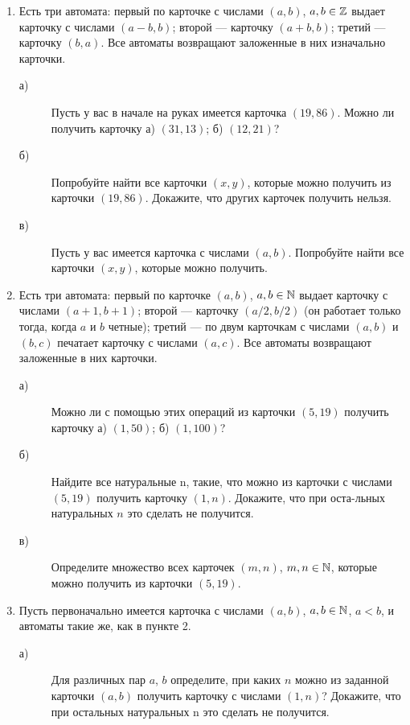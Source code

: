 \begin{enumerate}
\item Есть три автомата: первый по карточке с числами $(a, b)$, $a, b \in \mathbb{Z}$ выдает карточку с числами $(a - b, b)$;  второй — карточку $(a + b, b)$;  третий — карточку $(b, a)$. Все автоматы возвращают заложенные в них изначально карточки.
    \begin{description}
    \item [а) ]Пусть у вас в начале на руках имеется карточка $(19, 86)$. Можно ли получить карточку а) $(31,13)$;  б) $(12, 21)$?
    \item [б) ]Попробуйте найти все карточки $(x, y)$, которые можно получить из карточки $(19, 86)$. Докажите, что других карточек получить нельзя.
    \item [в) ]Пусть у вас имеется карточка с числами $(a, b)$. Попробуйте найти все карточки $(x, y)$, которые можно получить.
    \end{description}
 \item Есть три автомата: первый по карточке $(a, b)$, $a, b \in \mathbb{N}$ выдает карточку с числами $(a + 1, b + 1)$;  второй — карточку $(a/2,b/2)$ (он работает только тогда, когда $a$ и $b$ четные);  третий — по двум карточкам с числами $(a, b)$ и $(b, c)$ печатает карточку с числами $(a, c)$. Все автоматы возвращают заложенные в них карточки.
     \begin{description}
    \item [а) ]Можно ли с помощью этих операций из карточки $(5, 19)$ получить карточку а) $(1,50)$;  б) $(1, 100)$?
    \item [б) ]Найдите все натуральные n, такие, что можно из карточки с числами $(5, 19)$ получить карточку $(1, n)$. Докажите, что при оста-\linebreak льных натуральных $n$ это сделать не получится.
    \item [в) ]Определите множество всех карточек $(m, n)$, $m, n \in \mathbb{N}$, которые можно получить из карточки $(5, 19)$.
    \end{description}
 \item Пусть первоначально имеется карточка с числами $(a, b)$, $a, b \in \mathbb{N}$, $a < b$, и автоматы такие же, как в пункте 2.
 \begin{description}
    \item [а) ]Для различных пар $a$, $b$ определите, при каких $n$ можно из заданной карточки $(a, b)$ получить карточку с числами $(1, n)$? Докажите, что при остальных натуральных n это сделать не получится.

\end{description}
\end{enumerate}
